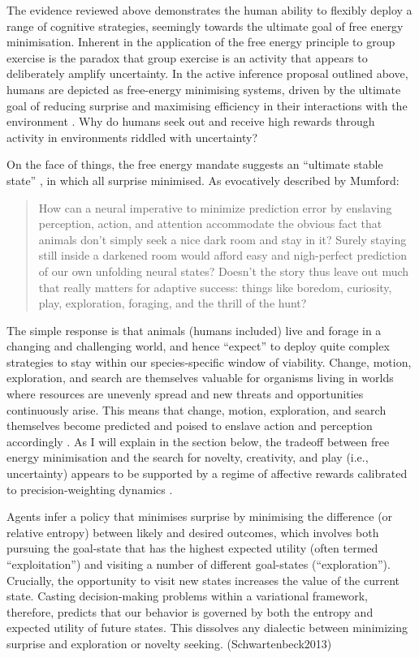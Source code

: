 \begin{CJK}{UTF8}{gbsn}
The evidence reviewed above demonstrates the human ability to flexibly deploy a range of cognitive strategies, seemingly towards the ultimate goal of free energy minimisation.  Inherent in the application of the free energy principle to group exercise is the paradox that group exercise is an activity that appears to deliberately amplify uncertainty.  In the active inference proposal outlined above, humans are depicted as free-energy minimising systems, driven by the ultimate goal of reducing surprise and maximising efficiency in their interactions with the environment \citep{Friston2010}.  Why do humans seek out and receive high rewards through activity in environments riddled with uncertainty?

On the face of things, the free energy mandate suggests an ``ultimate stable state'' \citep{Mumford1992}, in which all surprise minimised.  As evocatively described by Mumford:

\begin{quote}
  How can a neural imperative to minimize prediction error by enslaving perception, action, and attention accommodate the obvious fact that animals don’t simply seek a nice dark room and stay in it? Surely staying still inside a darkened room would afford easy and nigh-perfect prediction of our own unfolding neural states? Doesn’t the story thus leave out much that really matters for adaptive success: things like boredom, curiosity, play, exploration, foraging, and the thrill of the hunt? \citep[243]{Mumford1992}
\end{quote}

The simple response is that animals (humans included) live and forage in a changing and challenging world, and hence ``expect'' to deploy quite complex strategies to stay within our species-specific window of viability.  Change, motion, exploration, and search are themselves valuable for organisms living in worlds where resources are unevenly spread and new threats and opportunities continuously arise. This means that change, motion, exploration, and search themselves become predicted and poised to enslave action and perception accordingly \citep[193]{Clark2013}.  As I will explain in the section below, the tradeoff between free energy minimisation and the search for novelty, creativity, and play (i.e., uncertainty) appears to be supported by a regime of affective rewards calibrated to precision-weighting dynamics \citep{Chetverikov2016}.

Agents infer a policy that minimises surprise by minimising the difference (or relative entropy) between likely and desired outcomes, which involves both pursuing the goal-state that has the highest expected utility (often termed “exploitation”) and visiting a number of different goal-states (“exploration”). Crucially, the opportunity to visit new states increases the value of the current state. Casting decision-making problems within a variational framework, therefore, predicts that our behavior is governed by both the entropy and expected utility of future states. This dissolves any dialectic between minimizing surprise and exploration or novelty seeking.
(Schwartenbeck2013)




\end{CJK}
